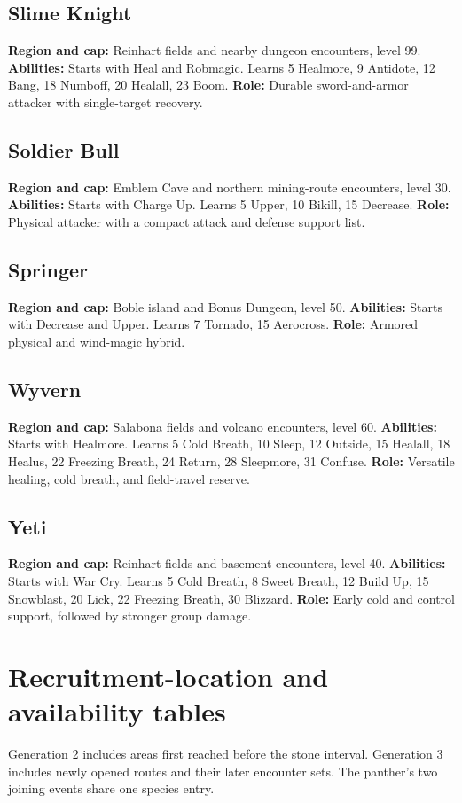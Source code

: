 \subsection{Slime Knight}
\textbf{Region and cap:} Reinhart fields and nearby dungeon encounters, level 99.
\textbf{Abilities:} Starts with Heal and Robmagic. Learns 5 Healmore,
9 Antidote, 12 Bang, 18 Numboff, 20 Healall, 23 Boom.
\textbf{Role:} Durable sword-and-armor attacker with single-target recovery.

\subsection{Soldier Bull}
\textbf{Region and cap:} Emblem Cave and northern mining-route encounters, level 30.
\textbf{Abilities:} Starts with Charge Up. Learns 5 Upper, 10 Bikill,
15 Decrease.
\textbf{Role:} Physical attacker with a compact attack and defense support list.

\subsection{Springer}
\textbf{Region and cap:} Boble island and Bonus Dungeon, level 50.
\textbf{Abilities:} Starts with Decrease and Upper. Learns 7 Tornado,
15 Aerocross.
\textbf{Role:} Armored physical and wind-magic hybrid.

\subsection{Wyvern}
\textbf{Region and cap:} Salabona fields and volcano encounters, level 60.
\textbf{Abilities:} Starts with Healmore. Learns 5 Cold Breath, 10 Sleep,
12 Outside, 15 Healall, 18 Healus, 22 Freezing Breath, 24 Return,
28 Sleepmore, 31 Confuse.
\textbf{Role:} Versatile healing, cold breath, and field-travel reserve.

\subsection{Yeti}
\textbf{Region and cap:} Reinhart fields and basement encounters, level 40.
\textbf{Abilities:} Starts with War Cry. Learns 5 Cold Breath, 8 Sweet Breath,
12 Build Up, 15 Snowblast, 20 Lick, 22 Freezing Breath, 30 Blizzard.
\textbf{Role:} Early cold and control support, followed by stronger group damage.

\section{Recruitment-location and availability tables}
Generation 2 includes areas first reached before the stone interval.
Generation 3 includes newly opened routes and their later encounter sets.
The panther's two joining events share one species entry.

